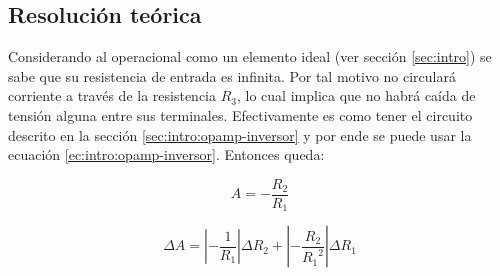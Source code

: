 \subsection{Resolución teórica}

Considerando al operacional como un elemento ideal (ver sección \ref{sec:intro}) se sabe que su resistencia de entrada es infinita. Por tal motivo no circulará corriente a través de la resistencia $R_3$, lo cual implica que no habrá caída de tensión alguna entre sus terminales. Efectivamente es como tener el circuito descrito en la sección \ref{sec:intro:opamp-inversor} y por ende se puede usar la ecuación \ref{ec:intro:opamp-inversor}. Entonces queda:

\begin{equation}
    \label{ec:1-teoria:ganancia}
    A = -\frac{R_2}{R_1}
\end{equation}

\begin{equation}
    \label{ec:1-teoria:err-ganancia}
    \Delta A = \left| - \frac{1}{R_1} \right| \Delta R_2
             + \left| - \frac{R_2}{{R_1}^2} \right| \Delta R_1
\end{equation}

